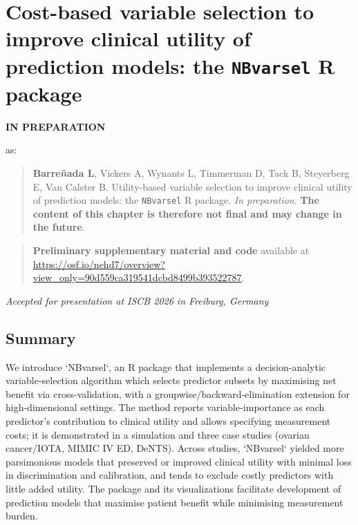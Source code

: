 \chapter[\texttt{NBvarsel}: Cost-based variable selection]{Cost-based variable selection to improve clinical utility of prediction models: the \texttt{NBvarsel} R package }
\label{sec:chp_varselection}

\begin{flushleft}
{\huge\sffamily \textbf{IN PREPARATION}}
\end{flushleft}

as: 
\begin{quote}
\textbf{Barreñada L}, Vickers A, Wynants L, Timmerman D, Tack B, Steyerberg E, Van Calster B. Utility-based variable selection to improve clinical utility of prediction models: the \texttt{NBvarsel} R package. \textit{In preparation}. \textbf{The content of this chapter is therefore not final and may change in the future}.
\end{quote}

\begin{quote}
\textbf{Preliminary supplementary material and code} available at \url{https://osf.io/nehd7/overview?view_only=90d559ca319541dcbd8499b393522787}.
\end{quote}
\vspace{0.2em}
\noindent\scriptsize\textit{Accepted for presentation at ISCB 2026 in Freiburg, Germany}
\normalsize\vspace{-0.5em}

\section*{Summary}\label{abstract}

We introduce `NBvarsel`, an R package that implements a decision-analytic variable-selection algorithm which selects predictor subsets by maximising net benefit via cross-validation, with a groupwise/backward-elimination extension for high-dimensional settings. The method reports variable-importance as each predictor's contribution to clinical utility and allows specifying measurement costs; it is demonstrated in a simulation and three case studies (ovarian cancer/IOTA, MIMIC IV ED, DeNTS). Across studies, `NBvarsel` yielded more parsimonious models that preserved or improved clinical utility with minimal loss in discrimination and calibration, and tends to exclude costly predictors with little added utility. The package and its visualizations facilitate development of prediction models that maximise patient benefit while minimising measurement burden.


